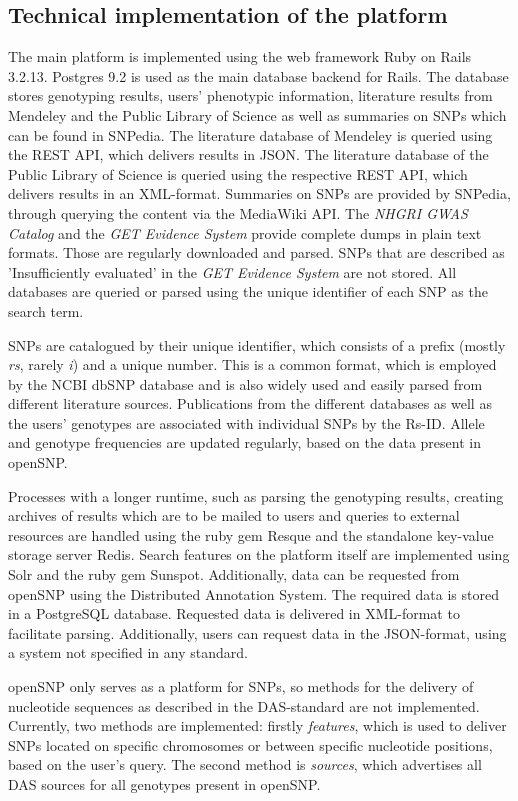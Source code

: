 \documentclass[10pt]{article}
\begin{document}
\subsection*{Technical implementation of the platform}
The main platform is implemented using the web framework Ruby on Rails 3.2.13. Postgres 9.2 is used as the main database backend for Rails. 
The database stores genotyping results, users' phenotypic information, literature results from Mendeley and the Public Library of Science as well as summaries on SNPs 
which can be found in SNPedia. The literature database of Mendeley is queried using the REST API, which delivers results in JSON. The literature database of 
the Public Library of Science is queried using the respective REST API, which delivers results in an XML-format. Summaries on SNPs are provided by SNPedia, 
through querying the content via the MediaWiki API. The \emph{NHGRI GWAS Catalog} and the \emph{GET Evidence System} provide complete dumps in plain text formats. Those are regularly downloaded and parsed. SNPs that are described as 'Insufficiently evaluated' in the \emph{GET Evidence System} are not stored. All databases are queried or parsed using the unique identifier of each SNP as the search term. 

SNPs are catalogued by their unique identifier, which consists of a prefix (mostly \textit{rs}, rarely \textit{i}) and a unique number. This is a common format, 
which is employed by the NCBI dbSNP database \cite{Sherry2001} and is also widely used and easily parsed from different literature sources. Publications from the different databases as 
well as the users' genotypes are associated with individual SNPs by the Rs-ID. Allele and genotype frequencies are updated regularly, based on the data present in openSNP. 

Processes with a longer runtime, such as parsing the genotyping results, creating archives of results which are to be mailed to users and queries to external resources 
are handled using the ruby gem Resque and the standalone key-value storage server Redis. Search features on the platform itself are implemented using Solr and the ruby gem Sunspot. 
Additionally, data can be requested from openSNP using the Distributed Annotation System. The required data is stored in a PostgreSQL database.  
Requested data is delivered in XML-format to facilitate parsing. Additionally, users can request data in the JSON-format, using a system not specified in any standard.

openSNP only serves as a platform for SNPs, so methods for the delivery of nucleotide sequences as described in the DAS-standard are not implemented. Currently, 
two methods are implemented: firstly \textit{features}, which is used to deliver SNPs located on specific chromosomes or between specific nucleotide positions, 
based on the user's query. The second method is \textit{sources}, which advertises all DAS sources for all genotypes present in openSNP.
\end{document}
